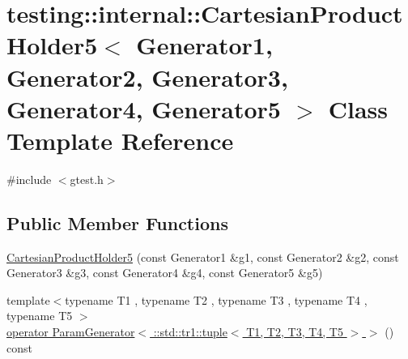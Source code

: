\hypertarget{classtesting_1_1internal_1_1_cartesian_product_holder5}{\section{testing\-:\-:internal\-:\-:Cartesian\-Product\-Holder5$<$ Generator1, Generator2, Generator3, Generator4, Generator5 $>$ Class Template Reference}
\label{classtesting_1_1internal_1_1_cartesian_product_holder5}
}


{\ttfamily \#include $<$gtest.\-h$>$}

\subsection*{Public Member Functions}
\begin{DoxyCompactItemize}
\item 
\hyperlink{classtesting_1_1internal_1_1_cartesian_product_holder5_afb3a413ff0e59f31e621937f968d0923}{Cartesian\-Product\-Holder5} (const Generator1 \&g1, const Generator2 \&g2, const Generator3 \&g3, const Generator4 \&g4, const Generator5 \&g5)
\item 
{\footnotesize template$<$typename T1 , typename T2 , typename T3 , typename T4 , typename T5 $>$ }\\\hyperlink{classtesting_1_1internal_1_1_cartesian_product_holder5_a4222dcf18066166933092692bb6925b1}{operator Param\-Generator$<$ \-::std\-::tr1\-::tuple$<$ T1, T2, T3, T4, T5 $>$ $>$} () const 
\end{DoxyCompactItemize}


